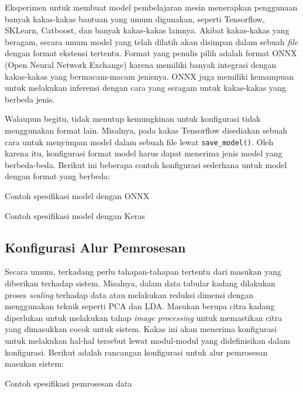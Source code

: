 Eksperimen untuk membuat model pembelajaran mesin menerapkan penggunaan banyak kakas-kakas bantuan yang umum digunakan, seperti Tensorflow, SKLearn, Catboost, dan banyak kakas-kakas lainnya.
Akibat kakas-kakas yang beragam, secara umum model yang telah dilatih akan disimpan dalam sebuah \textit{file} dengan format ekstensi tertentu.
Format yang penulis pilih adalah format ONNX (Open Neural Network Exchange) karena memiliki banyak integrasi dengan kakas-kakas yang bermacam-macam jenisnya.
ONNX juga memiliki kemampuan untuk melakukan inferensi dengan cara yang seragam untuk kakas-kakas yang berbeda jenis.

Walaupun begitu, tidak menutup kemungkinan untuk konfigurasi tidak menggunakan format lain.
Misalnya, pada kakas Tensorflow disediakan sebuah cara untuk menyimpan model dalam sebuah file lewat \texttt{save_model()}.
Oleh karena itu, konfigurasi format model harus dapat menerima jenis model yang berbeda-beda.
Berikut ini beberapa contoh konfigurasi sederhana untuk model dengan format yang berbeda:

\begin{code}
	\caption{Contoh spesifikasi model dengan ONNX}
	\label{listing:5}
\end{code}
\begin{code}
	\caption{Contoh spesifikasi model dengan Keras}
	\label{listing:6}
\end{code}

\subsection{Konfigurasi Alur Pemrosesan}\label{section:03-processing-pipeline}
Secara umum, terkadang perlu tahapan-tahapan tertentu dari masukan yang diberikan terhadap sistem.
Misalnya, dalam data tabular kadang dilakukan proses \textit{scaling} terhadap data atau melakukan reduksi dimensi dengan menggunakan teknik seperti PCA dan LDA.
Masukan berupa citra kadang diperlukan untuk melakukan tahap \textit{image processing} untuk memastikan citra yang dimasukkan cocok untuk sistem.
Kakas ini akan menerima konfigurasi untuk melakukan hal-hal tersebut lewat modul-modul yang didefinisikan dalam konfigurasi.
Berikut adalah rancangan konfigurasi untuk alur pemrosesan masukan sistem:

\begin{code}
	\caption{Contoh spesifikasi pemrosesan data}
	\label{listing:7}
\end{code}

